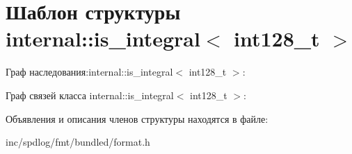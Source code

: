 \hypertarget{structinternal_1_1is__integral_3_01int128__t_01_4}{}\section{Шаблон структуры internal\+:\+:is\+\_\+integral$<$ int128\+\_\+t $>$}
\label{structinternal_1_1is__integral_3_01int128__t_01_4}


Граф наследования\+:internal\+:\+:is\+\_\+integral$<$ int128\+\_\+t $>$\+:


Граф связей класса internal\+:\+:is\+\_\+integral$<$ int128\+\_\+t $>$\+:


Объявления и описания членов структуры находятся в файле\+:\begin{DoxyCompactItemize}
\item 
inc/spdlog/fmt/bundled/format.\+h\end{DoxyCompactItemize}
